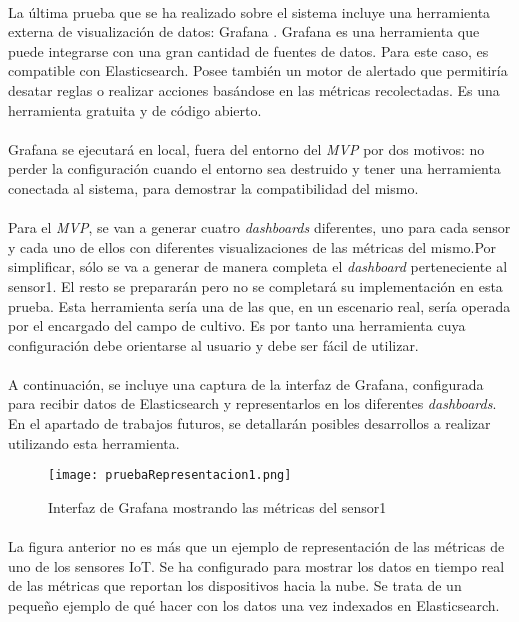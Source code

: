 \documentclass[../../memoria.tex]{subfiles}
\begin{document}
\paragraph{}
La última prueba que se ha realizado sobre el sistema incluye una herramienta externa de visualización de datos: Grafana \cite{grafana}. Grafana es una herramienta que puede integrarse con una gran cantidad de fuentes de datos. Para este caso, es compatible con Elasticsearch. Posee también un motor de alertado que permitiría desatar reglas o realizar acciones basándose en las métricas recolectadas. Es una herramienta gratuita y de código abierto.

\paragraph{}
Grafana se ejecutará en local, fuera del entorno del \textit{MVP} por dos motivos: no perder la configuración cuando el entorno sea destruido y tener una herramienta conectada al sistema, para demostrar la compatibilidad del mismo.

\paragraph{}
Para el \textit{MVP}, se van a generar cuatro \textit{dashboards} diferentes, uno para cada sensor y cada uno de ellos con diferentes visualizaciones de las métricas del mismo.Por simplificar, sólo se va a generar de manera completa el \textit{dashboard} perteneciente al sensor1. El resto se prepararán pero no se completará su implementación en esta prueba. Esta herramienta sería una de las que, en un escenario real, sería operada por el encargado del campo de cultivo. Es por tanto una herramienta cuya configuración debe orientarse al usuario y debe ser fácil de utilizar.

\paragraph{}
A continuación, se incluye una captura de la interfaz de Grafana, configurada para recibir datos de Elasticsearch y representarlos en los diferentes \textit{dashboards}. En el apartado de trabajos futuros, se detallarán posibles desarrollos a realizar utilizando esta herramienta.

\begin{figure}[H]
    \centering
    \texttt{[image: pruebaRepresentacion1.png]}
    \caption{Interfaz de Grafana mostrando las métricas del sensor1}
    \label{fig:pruebaRepresentacion1}
\end{figure}

\paragraph{}
La figura anterior no es más que un ejemplo de representación de las métricas de uno de los sensores IoT. Se ha configurado para mostrar los datos en tiempo real de las métricas que reportan los dispositivos hacia la nube. Se trata de un pequeño ejemplo de qué hacer con los datos una vez indexados en Elasticsearch.
\end{document}
